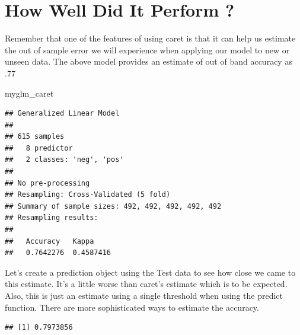 \documentclass[
]{book}
\newenvironment{Shaded}{\begin{snugshade}}{\end{snugshade}}
\newcommand{\CommentTok}[1]{\textcolor[rgb]{0.56,0.35,0.01}{\textit{#1}}}
\newcommand{\DataTypeTok}[1]{\textcolor[rgb]{0.13,0.29,0.53}{#1}}
\newcommand{\KeywordTok}[1]{\textcolor[rgb]{0.13,0.29,0.53}{\textbf{#1}}}
\newcommand{\NormalTok}[1]{#1}
\newcommand{\OperatorTok}[1]{\textcolor[rgb]{0.81,0.36,0.00}{\textbf{#1}}}
\newcommand{\StringTok}[1]{\textcolor[rgb]{0.31,0.60,0.02}{#1}}
\begin{document}
\hypertarget{how-well-did-it-perform}{%
\section{How Well Did It Perform ?}\label{how-well-did-it-perform}}

Remember that one of the features of using caret is that it can help us estimate the out of sample error we will experience when applying our model to new or unseen data. The above model provides an estimate of out of band accuracy as .77

\begin{Shaded}
\begin{Highlighting}[]
\NormalTok{myglm_caret}
\end{Highlighting}
\end{Shaded}

\begin{verbatim}
## Generalized Linear Model 
## 
## 615 samples
##   8 predictor
##   2 classes: 'neg', 'pos' 
## 
## No pre-processing
## Resampling: Cross-Validated (5 fold) 
## Summary of sample sizes: 492, 492, 492, 492, 492 
## Resampling results:
## 
##   Accuracy   Kappa    
##   0.7642276  0.4587416
\end{verbatim}

Let's create a prediction object using the Test data to see how close we came to this estimate. It's a little worse than caret's estimate which is to be expected. Also, this is just an estimate using a single threshold when using the predict function. There are more sophisticated ways to estimate the accuracy.

\begin{Shaded}
\end{Shaded}

\begin{verbatim}
## [1] 0.7973856
\end{verbatim}
\end{document}
